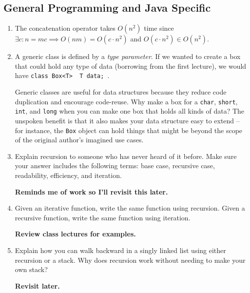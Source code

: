 \documentclass[10pt]{article}
\begin{document}
\subsection{General Programming and Java Specific}
\begin{enumerate}[leftmargin=0em]\addtocounter{enumi}{39}
\item The concatenation operator takes $O(n^2)$ time since $\exists c : n = mc \implies O(nm) = O(c\cdot n^2)$ and $O(c\cdot n^2) \in O(n^2)$.
\item A generic class is defined by a \textit{type parameter}. If we wanted to create a box that could hold any type of data (borrowing from the first lecture), we would have \texttt{class Box<T> { T data; }}.

Generic classes are useful for data structures because they reduce code duplication and encourage code-reuse. Why make a box for a \texttt{char}, \texttt{short}, \texttt{int}, and \texttt{long} when you can make one box that holds all kinds of data? The unspoken benefit is that it also makes your data structure easy to extend -- for instance, the \texttt{Box} object can hold things that might be beyond the scope of the original author's imagined use cases.
\item Explain recursion to someone who has never heard of it before. Make sure your answer includes the following terms: base case, recursive case, readability, efficiency, and iteration.

\textbf{Reminds me of work so I'll revisit this later.}
\item Given an iterative function, write the same function using recursion. Given a recursive function, write the same function using iteration.

\textbf{Review class lectures for examples.}
\item Explain how you can walk backward in a singly linked list using either recursion or a stack. Why does recursion work without needing to make your own stack?

\textbf{Revisit later.}
\end{enumerate}


\label{LastPage}~
\end{document}
